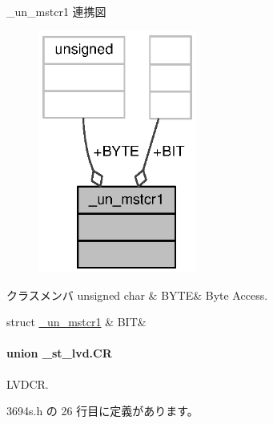\+\_\+un\+\_\+mstcr1 連携図
\nopagebreak
\begin{figure}[H]
\begin{center}
\leavevmode
\includegraphics[width=148pt]{d2/dff/union__un__mstcr1__coll__graph}
\end{center}
\end{figure}
\begin{DoxyFields}{クラスメンバ}
unsigned char\label{3694s_8h_a79f8f4e4e2b550825c90bdbf7cb48b44}
&
B\+Y\+T\+E&
Byte Access. \\
\hline

struct \hyperlink{3694s_8h_d8/d99/struct__un__mstcr1_8BIT}{\+\_\+un\+\_\+mstcr1}\label{3694s_8h_a8f5f22843ef71a6d0cfb92607ef15e3c}
&
B\+I\+T&
\\
\hline

\end{DoxyFields}
\label{union__st__lvd_8CR}
\paragraph{union \+\_\+st\+\_\+lvd.\+C\+R}
L\+V\+D\+C\+R. 

 3694s.\+h の 26 行目に定義があります。



